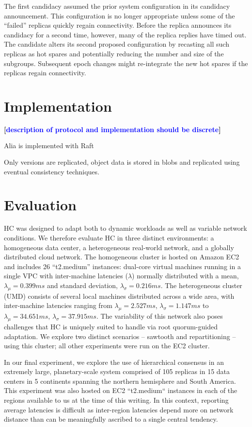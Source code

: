 \documentclass[10pt,conference]{IEEEtran}
\renewcommand{\pjk}[1]{{\bf
    [\marginpar[\hbox{{\textcolor{blue}{pjk}}\raisebox{0ex}{\Huge $\rightarrow$}}]%
{\hbox{\raisebox{0ex}{\Huge $\leftarrow$}{\textcolor{blue}{pjk}}}}\textcolor{blue}{#1}]}}
\begin{document}
The first candidacy assumed the prior system configuration in its candidacy
announcement.
This configuration is no longer appropriate unless some of the ``failed''
replicas quickly regain connectivity.
Before the replica announces its candidacy for a second time, however, many of
the replica replies have timed out.
The candidate alters its second proposed configuration by recasting all such
replicas as hot spares and potentially reducing the number and size of the
subgroups.
Subsequent epoch changes might re-integrate the new hot spares if the replicas
regain connectivity.

\section{Implementation}
\label{section:implementation}

\pjk{description of protocol and implementation should be discrete}

Alia is implemented with Raft

Only versions are replicated, object data is stored in blobs and replicated using
eventual consistency techniques.

\section{Evaluation}
\label{section:evaluation}

HC was designed to adapt both to dynamic workloads as well as variable network
conditions.
We therefore evaluate HC in three distinct environments: a homogeneous data center, a
heterogeneous real-world network, and a globally distributed cloud network.
The homogeneous cluster is hosted on Amazon EC2 and includes 26 ``t2.medium'' instances:
dual-core virtual machines running in a single VPC with inter-machine latencies
($\lambda$) normally distributed with a mean, $\lambda_{\mu}=0.399ms$ and standard
deviation, $\lambda_{\sigma}=0.216ms$.
The heterogeneous cluster (UMD) consists of several local machines distributed across a
wide area, with inter-machine latencies ranging from
$\lambda_{\mu}=2.527ms$,
$\lambda_{\sigma}=1.147ms$ to $\lambda_{\mu}=34.651ms$,
$\lambda_{\sigma}=37.915ms$.
The variability of this network also poses challenges that HC is uniquely suited to
handle via root quorum-guided adaptation.
We explore two distinct scenarios -- sawtooth and repartitioning -- using this cluster;
all other experiments were run on the EC2 cluster.

In our final experiment, we explore the use of hierarchical consensus in an extremely
large, planetary-scale system comprised of 105 replicas in 15 data centers in 5
continents spanning the northern hemisphere and South America. This experiment was also
hosted on EC2 ``t2.medium`` instances in each of the regions available to us at the time
of this writing. In this context, reporting average latencies is difficult as
inter-region latencies depend more on network distance than can be meaningfully
ascribed to a single central tendency.
\end{document}
